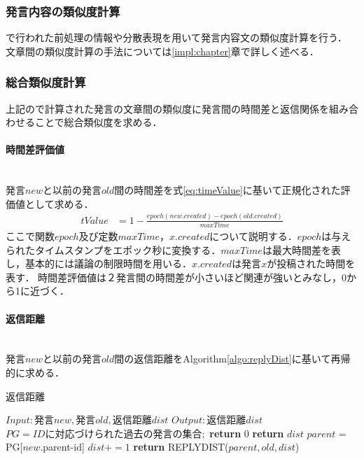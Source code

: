 \subsubsection*{ 発言内容の類似度計算}
\label{model:simRemark:2}
で行われた前処理の情報や分散表現を用いて発言内容文の類似度計算を行う．
文章間の類似度計算の手法については\ref{impl:chapter}章で詳しく述べる．
\subsubsection*{ 総合類似度計算}
上記ので計算された発言の文章間の類似度に発言間の時間差と返信関係を組み合わせることで総合類似度を求める．
\paragraph{時間差評価値}\ \\
発言$new$と以前の発言$old$間の時間差を式\ref{eq:timeValue}に基いて正規化された評価値として求める．
\begin{equation}
\begin{aligned}
\label{eq:timeValue}
tValue & = 1 - \frac{ epoch(new.created) - epoch(old.created) }{ maxTime }
\end{aligned}
\end{equation}
ここで関数$epoch$及び定数$maxTime$，$x.created$について説明する．$epoch$は与えられたタイムスタンプをエポック秒に変換する．$maxTime$は最大時間差を表し，基本的には議論の制限時間を用いる．$x.created$は発言$x$が投稿された時間を表す．
時間差評価値は２発言間の時間差が小さいほど関連が強いとみなし，0から1に近づく．

\paragraph{返信距離}\ \\
発言$new$と以前の発言$old$間の返信距離をAlgorithm\ref{algo:replyDist}に基いて再帰的に求める．
\begin{algorithm}
\caption{返信距離} \label{algo:replyDist}
\begin{algorithmic}[1]
\State $Input:  発言new,発言old,返信距離dist$ 
\State $Output: 返信距離dist$
\State $PG = IDに対応づけられた過去の発言の集合;$%
	\label{replyDist:if1-b}
		\State \textbf{return} 0\label{replyDist:if1-e}
	\label{replyDist:if2-b}
		\State \textbf{return} $dist$\label{replyDist:if2-e}
	 \Else\label{replyDist:if3-b}
	 	\State $parent$ = PG[$new$.parent-id]
		\State $dist+=1$
		\State \textbf{return} REPLYDIST($parent,old,dist$)\label{replyDist:if3-e}
	\EndIf
\EndProcedure
\end{algorithmic}
\end{algorithm}

